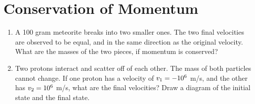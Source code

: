 \documentclass[10pt]{article}
\begin{document}
\section{Conservation of Momentum}
\begin{enumerate}
\item A 100 gram meteorite breaks into two smaller ones.  The two final velocities are observed to be equal, and in the same direction as the original velocity.  What are the masses of the two pieces, if momentum is conserved? \\ \vspace{1.5cm}
\item Two protons interact and scatter off of each other.  The mass of both particles cannot change.  If one proton has a velocity of $v_{\rm 1} = -10^{6}$ m/s, and the other has $v_{\rm 2} = 10^{6}$ m/s, what are the final velocities?  Draw a diagram of the initial state and the final state.  \\ \vspace{1.5 cm}
\end{enumerate}
\end{document}
